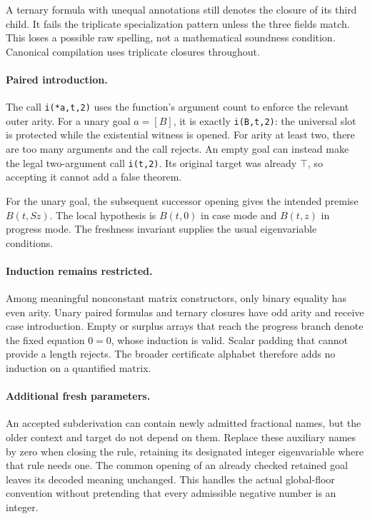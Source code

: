 \documentclass[11pt,letterpaper]{article}
\theoremstyle{definition}\newtheorem{definition}[theorem]{Definition}
\theoremstyle{remark}\newtheorem{remark}[theorem]{Remark}
\begin{document}
A ternary formula with unequal annotations still denotes the closure
of its third child.  It fails the triplicate specialization pattern
unless the three fields match.  This loses a possible raw spelling,
not a mathematical soundness condition.  Canonical compilation uses
triplicate closures throughout.

\paragraph{Paired introduction.}
The call \texttt{i(*a,t,2)} uses the function's argument count to enforce
the relevant outer arity.  For a unary goal $a=[B]$, it is exactly
\texttt{i(B,t,2)}: the universal slot is protected while the
existential witness is opened.  For arity at least two, there are too
many arguments and the call rejects.  An empty goal can instead make
the legal two-argument call \texttt{i(t,2)}.  Its original target was
already $\top$, so accepting it cannot add a false theorem.

For the unary goal, the subsequent successor opening gives the intended
premise $B(t,Sz)$.  The local hypothesis is $B(t,0)$ in case mode and
$B(t,z)$ in progress mode.  The freshness invariant supplies the
usual eigenvariable conditions.

\paragraph{Induction remains restricted.}
Among meaningful nonconstant matrix constructors, only binary equality
has even arity.  Unary paired formulas and ternary closures have odd
arity and receive case introduction.  Empty or surplus arrays that
reach the progress branch denote the fixed equation $0=0$, whose
induction is valid.  Scalar padding that cannot provide a length
rejects.  The broader certificate alphabet therefore adds no induction
on a quantified matrix.

\paragraph{Additional fresh parameters.}
An accepted subderivation can contain newly admitted fractional names,
but the older context and target do not depend on them.  Replace these
auxiliary names by zero when closing the rule, retaining its designated
integer eigenvariable where that rule needs one.  The common opening
of an already checked retained goal leaves its decoded meaning
unchanged.  This handles the actual global-floor convention without
pretending that every admissible negative number is an integer.
\end{document}

